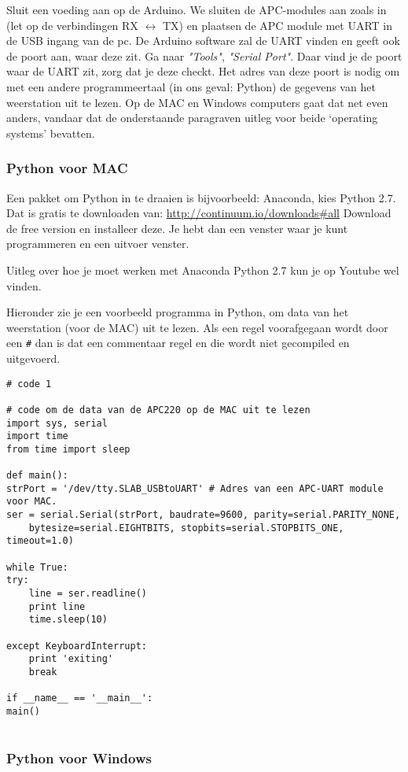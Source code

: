 Sluit een voeding aan op de Arduino.
We sluiten de APC-modules aan zoals in  (let op de
verbindingen RX $\longleftrightarrow$ TX) en plaatsen de APC module met UART
in de USB ingang van de pc. De Arduino software zal de UART vinden en
geeft ook de poort aan, waar deze zit. Ga naar \emph {"Tools"},
\emph{"Serial Port"}. Daar vind je de poort waar de UART zit, zorg dat je deze checkt.
Het adres van deze poort is nodig om met een andere programmeertaal (in ons
geval: Python) de gegevens van het weerstation uit te lezen. 
Op de MAC en Windows computers gaat dat net even anders, vandaar dat de onderstaande
paragraven uitleg voor beide `operating systems' bevatten.

\subsubsection{Python voor MAC}
Een pakket om Python in te draaien is bijvoorbeeld: Anaconda, kies Python 2.7.
Dat is gratis te downloaden van: \url{http://continuum.io/downloads#all}
Download de free version en installeer deze. Je hebt dan een venster waar je kunt
programmeren en een uitvoer venster. 

Uitleg over hoe je moet werken met Anaconda Python 2.7 kun je op Youtube wel vinden.

Hieronder zie je een voorbeeld programma in Python, om data van het weerstation 
(voor de MAC) uit te lezen.
Als een regel voorafgegaan wordt door een \verb|#| dan is dat een commentaar 
regel en die wordt niet gecompiled en uitgevoerd.

\begin{verbatim}
# code 1

# code om de data van de APC220 op de MAC uit te lezen
import sys, serial
import time
from time import sleep
      
def main():
strPort = '/dev/tty.SLAB_USBtoUART' # Adres van een APC-UART module voor MAC. 
ser = serial.Serial(strPort, baudrate=9600, parity=serial.PARITY_NONE, 
    bytesize=serial.EIGHTBITS, stopbits=serial.STOPBITS_ONE, timeout=1.0)
    
while True:
try:
    line = ser.readline()
    print line
    time.sleep(10)
 
except KeyboardInterrupt:
    print 'exiting'
    break
    
if __name__ == '__main__':
main()
    
\end{verbatim}

\subsubsection{Python voor Windows}

